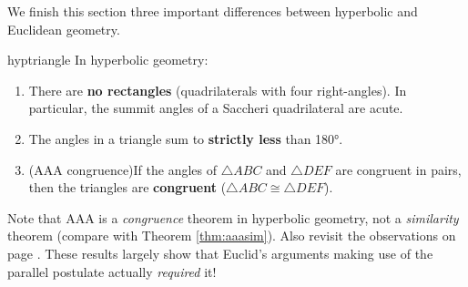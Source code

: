 \goodbreak



We finish this section three important differences between hyperbolic and Euclidean geometry.

\begin{thm}{}{hyptriangle}
	In hyperbolic geometry:
	\begin{enumerate}\itemsep0pt
	  \item There are \textbf{no rectangles} (quadrilaterals with four right-angles). In particular, the summit angles of a Saccheri quadrilateral are acute.
	  \item The angles in a triangle sum to \textbf{strictly less} than \ang{180}.
	  \item (AAA congruence)\lstsp If the angles of $\triangle ABC$ and $\triangle DEF$ are congruent in pairs, then the triangles are \textbf{congruent} ($\triangle ABC\cong\triangle DEF$).
	\end{enumerate}
\end{thm}

Note that AAA is a \emph{congruence} theorem in hyperbolic geometry, not a \emph{similarity} theorem (compare with Theorem \ref{thm:aaasim}). Also revisit the observations on page \pageref{pg:absolute}. These results largely show that Euclid's arguments making use of the parallel postulate actually \emph{required} it! 


